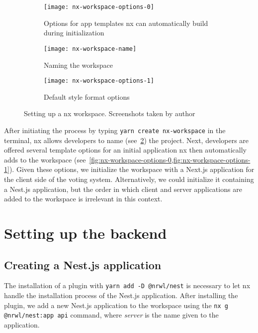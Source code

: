 \begin{figure}[h]
    \begin{subfigure}[b]{\textwidth}
        \centering
        \texttt{[image: nx-workspace-options-0]}
        \caption{Options for app templates nx can automatically build during initialization}
        \label{fig:nx-workspace-options-0}
    \end{subfigure}
    \begin{subfigure}[b]{0.5\textwidth}
        \centering
        \texttt{[image: nx-workspace-name]}
        \caption{Naming the workspace}
        \label{fig:nx-workspace-name}
    \end{subfigure}
    \begin{subfigure}[b]{0.5\textwidth}
        \centering
        \texttt{[image: nx-workspace-options-1]}
        \caption{Default style format options}
        \label{fig:nx-workspace-options-1}
    \end{subfigure}
    \caption[Setting up a nx workspace]{Setting up a nx workspace. Screenshots taken by author}
    \label{fig:setting-up-nx-workspace}
\end{figure}

After initiating the process by typing \texttt{yarn create nx-workspace} in the terminal, nx allows developers to name (see~\cref{fig:nx-workspace-name}) the project.
Next, developers are offered several template options for an initial application nx then automatically adds to the workspace (see~\cref{fig:nx-workspace-options-0,fig:nx-workspace-options-1}).
Given these options, we initialize the workspace with a Next.js application for the client side of the voting system.
Alternatively, we could initialize it containing a Nest.js application, but the order in which client and server applications are added to the workspace is irrelevant in this context.

\section{Setting up the backend}\label{sec:setting-up-a-nest.js-backend}

\subsection{Creating a Nest.js application}\label{subsec:creating-a-nest.js-application}

The installation of a plugin with \texttt{yarn add -D @nrwl/nest} is necessary to let nx handle the installation process of the Nest.js application.
After installing the plugin, we add a new Nest.js application to the workspace using the \texttt{nx g @nrwl/nest:app api} command, where \emph{server} is the name given to the application.

